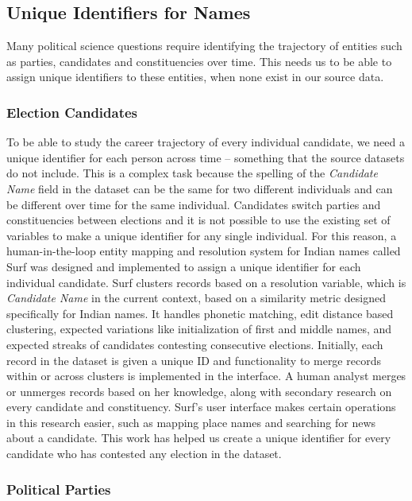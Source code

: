 \subsection{Unique Identifiers for Names}

Many political science questions require identifying the trajectory of entities such as parties, candidates and constituencies over time. This needs us to be able to assign unique identifiers to these entities, when none exist in our source data.

\subsubsection{Election Candidates}
\label{name_mapping}
To be able to study the career trajectory of every individual candidate, we need a unique identifier for each person across time -- something that the source datasets do not include. This is a complex task because the spelling of the \emph{Candidate Name} field in the dataset can be the same for two different individuals and can be different over time for the same individual. Candidates switch parties and constituencies between elections and it is not possible to use the existing set of variables to make a unique identifier for any single individual. For this reason, a human-in-the-loop entity mapping and resolution system for Indian names called Surf \cite{Surf} was designed and implemented to assign a unique identifier for each individual candidate. Surf clusters records based on a resolution variable, which is \emph{Candidate Name} in the current context, based on a similarity metric designed specifically for Indian names. It handles phonetic matching, edit distance based clustering, expected variations like initialization of first and middle names, and expected streaks of candidates contesting consecutive elections. Initially, each record in the dataset is given a unique ID and functionality to merge records within or across clusters is implemented in the interface. A human analyst merges or unmerges records based on her knowledge, along with secondary research on every candidate and constituency. Surf's user interface makes certain operations in this research easier, such as mapping place names and searching for news about a candidate. This work has helped us create a unique identifier for every candidate who has contested any election in the dataset.

\subsubsection{Political Parties}

